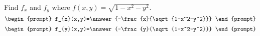 \documentclass{ximera}
\author{David Guichard \and Neal Koblitz \and H. Jerome Keisler \and Albert Scheller \and Barry Balof \and Mike Wills \and Matthew Carr}
\begin{document}
\begin{exercise}




Find $f_x$ and $f_y$ where $f(x,y)=\sqrt{1-x^2-y^2}$.
\[
\begin{prompt}
f_{x}(x,y)=\answer{-\frac{x}{\sqrt{1-x^2-y^2}}}
\end{prompt}
\]
\[
\begin{prompt}
f_{y}(x,y)=\answer{-\frac{y}{\sqrt{1-x^2-y^2}}}
\end{prompt}
\]

\end{exercise}
\end{document}

